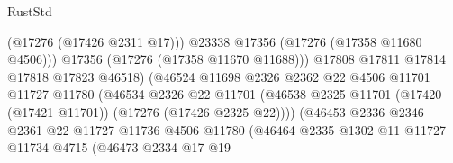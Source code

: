 \begin{lexlean}{RustStd}
\begin{coremodule}
                                                (@17276 (@17426 @2311 @17)))
                                              @23338
                                              @17356
                                              (@17276 (@17358 @11680 @4506)))
                                            @17356
                                            (@17276 (@17358 @11670 @11688)))
                                          @17808
                                          @17811
                                          @17814
                                          @17818
                                          @17823
                                          @46518)
                                        (@46524
                                          @11698
                                          @2326
                                          @2362
                                          @22
                                          @4506
                                          @11701
                                          @11727
                                          @11780
                                          (@46534
                                            @2326
                                            @22
                                            @11701
                                            (@46538
                                              @2325
                                              @11701
                                              (@17420 (@17421 @11701))
                                              (@17276 (@17426 @2325 @22))))
                                          (@46453
                                            @2336
                                            @2346
                                            @2361
                                            @22
                                            @11727
                                            @11736
                                            @4506
                                            @11780
                                            (@46464
                                              @2335
                                              @1302
                                              @11
                                              @11727
                                              @11734
                                              @4715
                                              (@46473
                                                @2334
                                                @17
                                                @19

\end{coremodule}
\end{lexlean}
